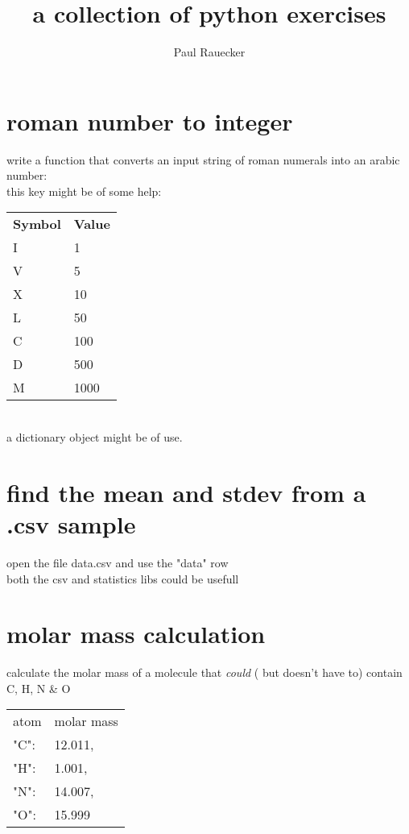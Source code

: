 \documentclass[10pt,a4paper]{article}
\title{a collection of python exercises}
\author{Paul Rauecker}
\begin{document}
\maketitle
\vspace{1cm}
\section{roman number to integer}
write a function that converts an input string of roman numerals into an arabic number: \\
this key might be of some help:

\vspace{10pt}
\begin{tabular}{l l}
\textbf{Symbol}       &\textbf{Value}\\
I             &1\\
V             &5\\
X             &10\\
L             &50\\
C             &100\\
D             &500\\
M             &1000\\
\end{tabular}
\vspace{4pt}
\\a dictionary object might be of use.


\section{find the mean and stdev from a .csv sample}
open the file data.csv and use the "data" row\\
both the csv and statistics libs could be usefull\\


\section{molar mass calculation}
calculate the molar mass of a molecule that \textit{could} ( but doesn't have to) contain C, H, N \& O

\vspace{10pt}
\begin{tabular}{l l}
atom    & molar mass\\
    "C": &12.011,\\
    "H": &1.001,\\
    "N": &14.007,\\
    "O": &15.999
\end{tabular}
\end{document}

